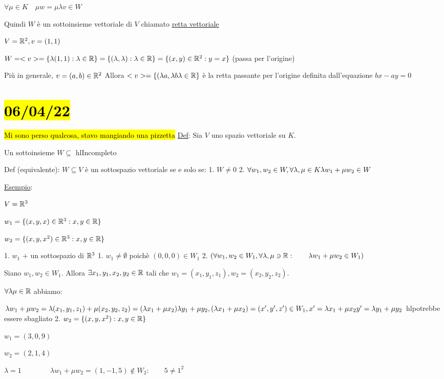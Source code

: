 \documentclass{article}
\begin{document}
          $\forall\mu\in K\quad\mu w=\mu\lambda v\in W$

          Quindi $W$ è un sottoinsieme vettoriale di $V$ chiamato \ul{retta vettoriale}

          $V=\mathbb{R}^2,v=(1,1)$

          $W=<v>=\{\lambda(1,1):\lambda\in\mathbb{R}\}=\{(\lambda,\lambda):\lambda\in\mathbb{R}\}=\{(x,y)\in\mathbb{R}^2:y=x\}$ (passa per l'origine)

          Più in generale, $v=(a,b)\in\mathbb{R}^2$ Allora $<v>=\{(\lambda a,\lambda b\lambda\in\mathbb{R}\}$ è la retta passante per l'origine definita dall'equazione $bx-ay=0$
\section{\hl{06/04/22}}
\hl{Mi sono perso qualcosa, stavo mangiando una pizzetta}
\ul{Def}: Sia $V$ uno spazio vettoriale su $K$.

Un sottoinsieme $W\subseteq$ hl{Incompleto}

Def (equivalente): $W\subseteq V$ è un sottospazio vettoriale se e solo se:
1. $W\not=0$
2. $\forall w_1,w_2\in W,\forall\lambda,\mu\in K\\\lambda w_1+\mu w_2\in W$

\ul{Esempio}:

$V=\mathbb{R}^3$

$w_1=\{(x,y,x)\in\mathbb{R}^3:x,y\in\mathbb{R}\}$

$w_2=\{(x,y,x^2)\in\mathbb{R}^3:x,y\in\mathbb{R}\}$

1. $w_1$ + un sottospazio di $\mathbb{R}^3$
   1. $w_1\not=\emptyset$ poichè $(0,0,0)\in W_1$
   2. $(\forall w_1,w_2\in W_1,\forall\lambda,\mu\ni\mathbb{R}:\qquad\lambda w_1+\mu w_2\in W_1)$

      Siano $w_1,w_2\in W_1$. Allora $\exists x_1,y_1,x_2,y_2\in\mathbb{R}$ tali che $w_1=(x_1,y_1,z_1),w_2=(x_2,y_2,z_2)$.

      $\forall\lambda\mu\in\mathbb{R}$ abbiamo:

      $\lambda w_1+\mu w_2=\lambda(x_1,y_1,z_1)+\mu(x_2,y_2,z_2)=(\lambda x_1+\mu x_2)\lambda y_1+\mu y_2,(\lambda x_1+\mu x_2)=(x',y',z')\in W_1,\\x'=\lambda x_1+\mu x_2\\y'=\lambda y_1+\mu y_2$ hl{potrebbe essere sbagliato}
2. $w_2=\{(x,y,x^2):x,y\in\mathbb{R}\}$

   $w_1=(3,0,9)$    

   $w_2=(2,1,4)$    

   $\lambda=1\qquad\qquad\lambda w_1+\mu w_2=(1,-1,5)\not\in W_2:\qquad5\not=1^2$
\end{document}
